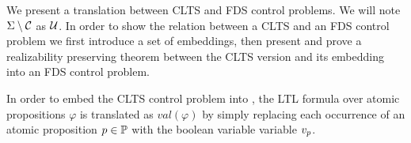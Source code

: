 
We present a translation between CLTS and FDS control problems. We will note $\Sigma \setminus \mathcal{C}$ as $\mathcal{U}$. In order to show the relation between a CLTS and an FDS control problem we first introduce a set of embeddings, then present and prove a realizability preserving theorem between the CLTS version and its embedding into an FDS  control problem.


In order to embed the CLTS control problem \controlProblemDef into \fdsEmbedding, the LTL formula over atomic propositions $\varphi$ is translated as $val(\varphi)$ by simply  replacing each occurrence of an atomic proposition $p \in \mathbb{P}$ with the boolean variable variable $v_{p}$.
%	

